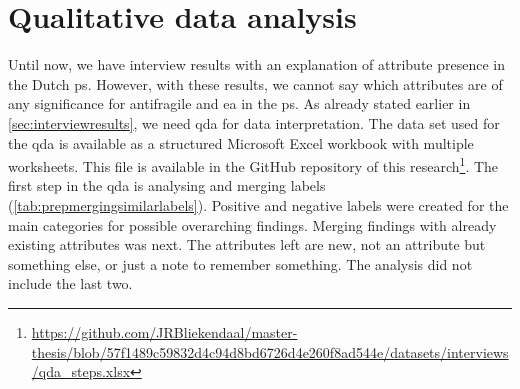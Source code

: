 \section{Qualitative data analysis}
\label{sec:dataprep}
Until now, we have interview results with an explanation of attribute presence in the Dutch \gls{ps}. However, with these results, we cannot say which attributes are of any significance for \gls{antifragile} and \gls{ea} in the \gls{ps}. As already stated earlier in \cref{sec:interviewresults}, we need \gls{qda} for data interpretation. The data set used for the \gls{qda} is available as a structured Microsoft Excel workbook with multiple worksheets. This file is available in the GitHub repository of this research\footnote{\url{https://github.com/JRBliekendaal/master-thesis/blob/57f1489c59832d4c94d8bd6726d4e260f8ad544e/datasets/interviews/qda_steps.xlsx}}. The first step in the \gls{qda} is analysing and merging labels (\cref{tab:prepmergingsimilarlabels}). Positive and negative labels were created for the main categories for possible overarching findings. Merging findings with already existing \glspl{attribute} was next. The \glspl{attribute} left are new, not an \gls{attribute} but something else, or just a note to remember something. The analysis did not include the last two. 
